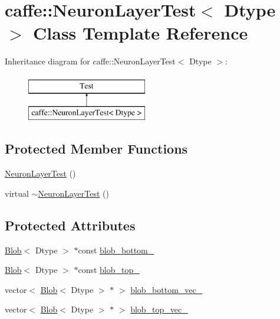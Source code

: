 \hypertarget{classcaffe_1_1_neuron_layer_test}{\section{caffe\+:\+:Neuron\+Layer\+Test$<$ Dtype $>$ Class Template Reference}
\label{classcaffe_1_1_neuron_layer_test}
}
Inheritance diagram for caffe\+:\+:Neuron\+Layer\+Test$<$ Dtype $>$\+:\begin{figure}[H]
\begin{center}
\leavevmode
\includegraphics[height=2.000000cm]{classcaffe_1_1_neuron_layer_test}
\end{center}
\end{figure}
\subsection*{Protected Member Functions}
\begin{DoxyCompactItemize}
\item 
\hyperlink{classcaffe_1_1_neuron_layer_test_aee198daa132b0631250413df5b3ced74}{Neuron\+Layer\+Test} ()
\item 
virtual \hyperlink{classcaffe_1_1_neuron_layer_test_a2e16f0e3db0dad2f44db7d520252cefc}{$\sim$\+Neuron\+Layer\+Test} ()
\end{DoxyCompactItemize}
\subsection*{Protected Attributes}
\begin{DoxyCompactItemize}
\item 
\hyperlink{classcaffe_1_1_blob}{Blob}$<$ Dtype $>$ $\ast$const \hyperlink{classcaffe_1_1_neuron_layer_test_a54d0371564c8241de164e82e0af6102c}{blob\+\_\+bottom\+\_\+}
\item 
\hyperlink{classcaffe_1_1_blob}{Blob}$<$ Dtype $>$ $\ast$const \hyperlink{classcaffe_1_1_neuron_layer_test_a6e54ba573a61360912ab557ca0de7cfd}{blob\+\_\+top\+\_\+}
\item 
vector$<$ \hyperlink{classcaffe_1_1_blob}{Blob}$<$ Dtype $>$ $\ast$ $>$ \hyperlink{classcaffe_1_1_neuron_layer_test_afeee26d10841e52eea2c488dc0ac39b7}{blob\+\_\+bottom\+\_\+vec\+\_\+}
\item 
vector$<$ \hyperlink{classcaffe_1_1_blob}{Blob}$<$ Dtype $>$ $\ast$ $>$ \hyperlink{classcaffe_1_1_neuron_layer_test_a3d6414a30d5c5d16c64edc9b71da81e3}{blob\+\_\+top\+\_\+vec\+\_\+}
\end{DoxyCompactItemize}


